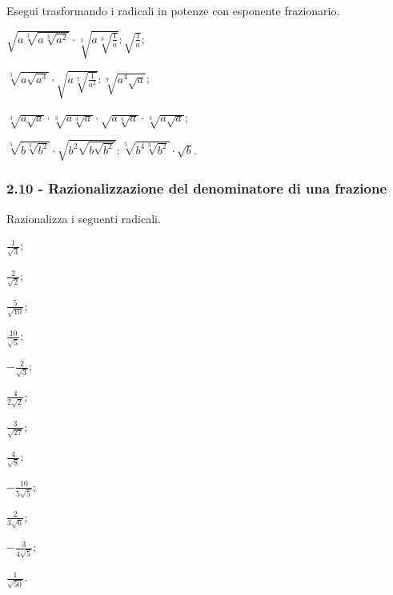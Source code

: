 \begin{esercizio}[\Ast]
 \label{ese:2.83}
Esegui trasformando i radicali in potenze con esponente frazionario.
 \begin{multicols}{2}
 \begin{enumeratea}
 \item $\sqrt{a\sqrt[3]{a\sqrt[3]{a^2}}}\cdot \sqrt[3]{a\sqrt[3]{\frac 1 a}}:\sqrt{\frac 1 a}$;
 \item $\sqrt[5]{a\sqrt{a^3}}\cdot \sqrt{a\sqrt[7]{\frac 1{a^2}}}:\sqrt[7]{a^4\sqrt a}$;
 \item $\sqrt[3]{a\sqrt a}\cdot \sqrt[3]{a\sqrt[3]a}\cdot \sqrt{a\sqrt[3]a}\cdot \sqrt[3]{a\sqrt a}$;
 \item $\sqrt[5]{b\sqrt[3]{b^2}}\cdot \sqrt{b^2\sqrt{b\sqrt{b^2}}}:\sqrt[5]{b^4\sqrt[3]{b^2}}\cdot \sqrt b$.
 \end{enumeratea}
 \end{multicols}
\end{esercizio}

\subsubsection*{2.10 - Razionalizzazione del denominatore di una frazione}

\begin{esercizio}[\Ast]
 \label{ese:2.84}
Razionalizza i seguenti radicali.
 \begin{multicols}{4}
 \begin{enumeratea}
 \item $\frac 1{\sqrt 3}$;
 \item $\frac 2{\sqrt 2}$;
 \item $\frac 5{\sqrt{10}}$;
 \item $\frac{10}{\sqrt 5}$;
 \item $-\frac 2{\sqrt 3}$;
 \item $\frac 4{2\sqrt 2}$;
 \item $\frac 3{\sqrt{27}}$;
 \item $\frac 4{\sqrt 8}$;
 \item $-\frac{10}{5\sqrt 5}$;
 \item $\frac 2{3\sqrt 6}$;
 \item $-\frac 3{4\sqrt 5}$;
 \item $\frac 1{\sqrt{50}}$.
 \end{enumeratea}
 \end{multicols}
\end{esercizio}

